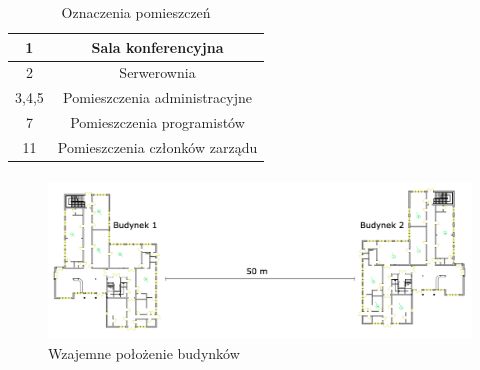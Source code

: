 \begin{table}[h]
  \begin{center}
      \begin{tabular}{|c|c|}
      \hline
        1       & Sala konferencyjna \\ \hline
        2       & Serwerownia \\ \hline
        3,4,5   & Pomieszczenia administracyjne \\ \hline
        7       & Pomieszczenia programistów \\ \hline
        11      & Pomieszczenia członków zarządu \\ \hline
     \end{tabular}
  \end{center}
  \caption{Oznaczenia pomieszczeń}
\end{table}

\paragraph{}
\paragraph{}
\paragraph{}
\begin{figure}[H]
  \begin{center}
    \includegraphics[width=\textwidth]{img/polo.png}
    \caption{Wzajemne położenie budynków}
  \end{center}
\end{figure}


